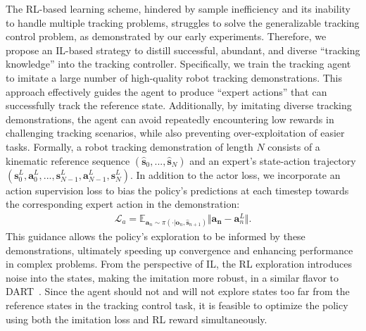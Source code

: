 The RL-based learning scheme, hindered by sample inefficiency and its inability to handle multiple tracking problems, struggles to solve the generalizable tracking control problem, as demonstrated by our early experiments. Therefore, we propose an IL-based strategy to distill successful, abundant, and diverse ``tracking knowledge'' into the tracking controller. Specifically, we train the tracking agent to imitate a large number of high-quality robot tracking demonstrations. 
This approach effectively guides the agent to produce ``expert actions'' that can successfully track the reference state. Additionally, by imitating diverse tracking demonstrations, the agent can avoid repeatedly encountering low rewards in challenging tracking scenarios, while also preventing over-exploitation of easier tasks.
Formally, a robot tracking demonstration of length \(N\) consists of a kinematic reference sequence \((\hat{\mathbf{s}}_0, ..., \hat{\mathbf{s}}_{N})\) and an expert's state-action trajectory \((\mathbf{s}_0^L, \mathbf{a}_0^L, ..., \mathbf{s}_{N-1}^L, \mathbf{a}_{N-1}^L, \mathbf{s}_N^L)\). 
In addition to the actor loss, we incorporate an action supervision loss to bias the policy's predictions at each timestep towards the corresponding expert action in the demonstration:
\begin{align}
    \mathcal{L}_a = \mathbb{E}_{\mathbf{a}_n\sim \pi(\cdot \vert \mathbf{o}_n, \hat{\mathbf{s}}_{n+1})} \Vert \mathbf{a_n} - \mathbf{a}^L_{n}  \Vert. 
\end{align}
This guidance allows the policy’s exploration to be informed by these demonstrations, ultimately speeding up convergence and enhancing performance in complex problems. From the perspective of IL, the RL exploration introduces noise into the states, making the imitation more robust, in a similar flavor to DART~\citep{laskey2017dart}. 
Since the agent should not and will not explore states too far from the reference states in the tracking control task, it is feasible to optimize the policy using both the imitation loss and RL reward simultaneously.





